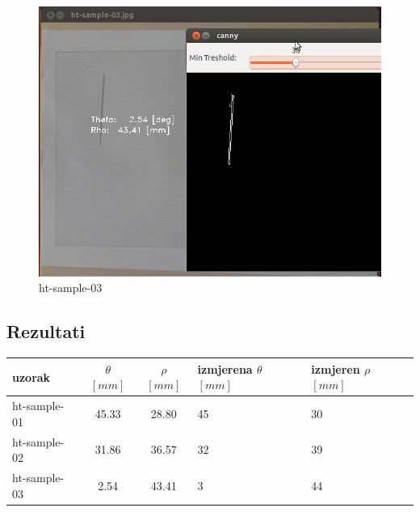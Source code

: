 \begin{figure}[h]
\centering
\includegraphics[scale=0.32]{images/lab3-sample-03.png}
\caption{ht-sample-03}
\label{fig:lab3-sample-03}
\end{figure}

\subsection{Rezultati}

\begin{center}
\centering
\begin{tabular}
{ l || c | c | p{1.6 cm} | p{1.6 cm}  }
{uzorak}  & {\(\theta\) $[mm]$ } & {\(\rho \) $[mm]$} & {izmjerena \(\theta\) $[mm]$} & {izmjeren \(\rho\) $[mm]$} \\ \hline
ht-sample-01 & 45.33 & 28.80 & 45 & 30 \\ \hline
ht-sample-02 & 31.86 & 36.57 & 32 & 39 \\ \hline
ht-sample-03 & 2.54 & 43.41 & 3 & 44 \\ 
\end{tabular}
\end{center}

\newpage
